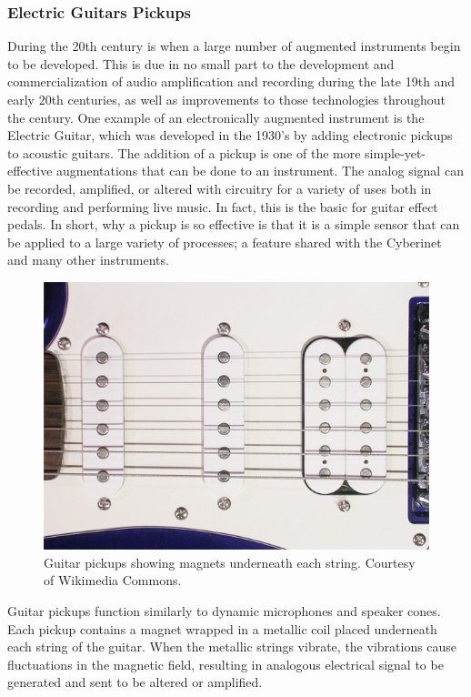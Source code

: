 \subsubsection{Electric Guitars Pickups}

During the 20th century is when a large number of augmented instruments begin to be developed. This is due in no small part to the development and commercialization of audio amplification and recording during the late 19th and early 20th centuries, as well as improvements to those technologies throughout the century. One example of an electronically augmented instrument is the Electric Guitar, which was developed in the 1930's by adding electronic pickups to acoustic guitars\cite{electric_guit_history}. The addition of a pickup is one of the more simple-yet-effective augmentations that can be done to an instrument. The analog signal can be recorded, amplified, or altered with circuitry for a variety of uses both in recording and performing live music. In fact, this is the basic for guitar effect pedals. In short, why a pickup is so effective is that it is a simple sensor that can be applied to a large variety of processes; a feature shared with the Cyberinet and many other instruments.

\begin{figure}
    \centering
    \includegraphics[scale=0.5]{diagrams/Pickup-SSH.jpg}
    \caption{Guitar pickups showing magnets underneath each string. Courtesy of Wikimedia Commons.} %
    \label{fig:pickups}
\end{figure}

Guitar pickups function similarly to dynamic microphones and speaker cones. Each pickup contains a magnet wrapped in a metallic coil placed underneath each string of the guitar. When the metallic strings vibrate, the vibrations cause fluctuations in the magnetic field, resulting in analogous electrical signal to be generated and sent to be altered or amplified\cite{coils09}.

